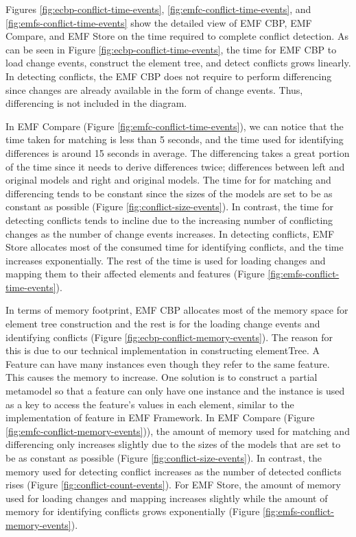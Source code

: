 Figures \ref{fig:ecbp-conflict-time-events}, \ref{fig:emfc-conflict-time-events}, and \ref{fig:emfs-conflict-time-events} show the detailed view of EMF CBP, EMF Compare, and EMF Store on the time required to complete conflict detection. As can be seen in Figure \ref{fig:ecbp-conflict-time-events}, the time for EMF CBP to load change events, construct the element tree, and detect conflicts grows linearly. In detecting conflicts, the EMF CBP does not require to perform differencing since changes are already available in the form of change events. Thus, differencing is not included in the diagram. 

In EMF Compare (Figure \ref{fig:emfc-conflict-time-events}), we can notice that the time taken for matching is less than 5 seconds, and the time used for identifying differences is around 15 seconds in average. The differencing takes a great portion of the time since it needs to derive differences twice; differences between left and original models and right and original models. The time for for matching and differencing tends to be constant since the sizes of the models are set to be as constant as possible (Figure \ref{fig:conflict-size-events}). In contrast, the time for detecting conflicts tends to incline due to the increasing number of conflicting changes as the number of change events increases. In detecting conflicts, EMF Store allocates most of the consumed time for identifying conflicts, and the time increases exponentially. The rest of the time is used for loading changes and mapping them to their affected elements and features (Figure \ref{fig:emfs-conflict-time-events}). 

In terms of memory footprint, EMF CBP allocates most of the memory space for element tree construction and the rest is for the loading change events and identifying conflicts (Figure \ref{fig:ecbp-conflict-memory-events}). The reason for this is due to our technical implementation in constructing \textsf{elementTree}. A Feature can have many instances even though they refer to the same feature. This causes the memory to increase. One solution is to construct a partial metamodel so that a feature can only have one instance and the instance is used as a key to access the feature's values in each element, similar to the implementation of feature in EMF Framework. In EMF Compare (Figure \ref{fig:emfc-conflict-memory-events})), the amount of memory used for matching and differencing only increases slightly due to the sizes of the models that are set to be as constant as possible (Figure \ref{fig:conflict-size-events}). In contrast, the memory used for detecting conflict increases as the number of detected conflicts rises (Figure \ref{fig:conflict-count-events}). For EMF Store, the amount of memory used for loading changes and mapping increases slightly while the amount of memory for identifying conflicts grows exponentially (Figure \ref{fig:emfs-conflict-memory-events}).



